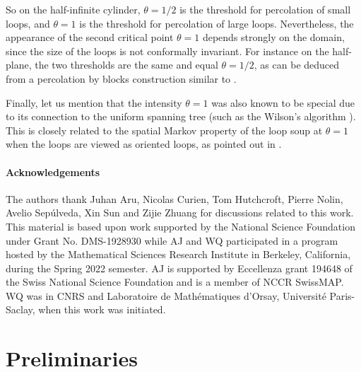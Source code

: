 \documentclass[11pt]{article}
\theoremstyle{remark}
\numberwithin{equation}{section}
\begin{document}
So on the half-infinite cylinder, $\theta=1/2$ is the threshold for percolation of small loops, 
and $\theta=1$ is the threshold for percolation of large loops. Nevertheless, the appearance of the second critical point $\theta=1$ depends strongly on the domain,
since the size of the loops is not conformally invariant.
For instance on the half-plane, the two thresholds are the same and equal 
$\theta=1/2$, as can be deduced from a percolation by blocks construction similar to \cite{Lupu2014LoopsHalfPlane}.

Finally, let us mention that the intensity $\theta = 1$ was also known to be special due to its connection to the uniform spanning tree (such as the Wilson's algorithm \cite{Wilson1996GeneratingRS,PROPP1998170}). This is closely related to the spatial Markov property of the loop soup at $\theta=1$ when the loops  are viewed as oriented loops, as pointed out in \cite{Werner2016}.


\paragraph*{Acknowledgements}

The authors thank Juhan Aru, Nicolas Curien, Tom Hutchcroft, Pierre Nolin, Avelio Sepúlveda, Xin Sun and Zijie Zhuang
for discussions related to this work.
This material is based upon work supported by the National Science Foundation under Grant No. DMS-1928930 while AJ and WQ participated in a program hosted by the Mathematical Sciences Research Institute in Berkeley, California, during the Spring 2022 semester.
AJ is supported by Eccellenza grant 194648 of the Swiss National Science Foundation and is a member of NCCR SwissMAP. WQ was in CNRS and Laboratoire de Math\'ematiques d’Orsay, Universit\'e Paris-Saclay, when this work was initiated.


\section{Preliminaries}
\end{document}
